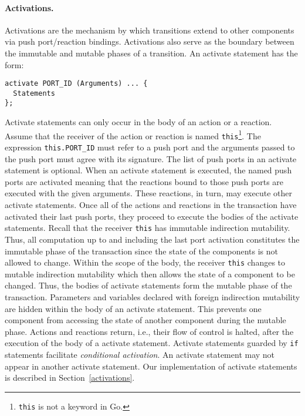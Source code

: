 \paragraph{Activations.}
Activations are the mechanism by which transitions extend to other components via push port/reaction bindings.
Activations also serve as the boundary between the immutable and mutable phases of a transition.
An activate statement has the form:
\begin{verbatim}
activate PORT_ID (Arguments) ... {
  Statements
};
\end{verbatim}
Activate statements can only occur in the body of an action or a reaction.
Assume that the receiver of the action or reaction is named \verb+this+\footnote{\verb+this+ is not a keyword in Go.}.
The expression \verb+this.PORT_ID+ must refer to a push port and the arguments passed to the push port must agree with its signature.
The list of push ports in an activate statement is optional.
When an activate statement is executed, the named push ports are activated meaning that the reactions bound to those push ports are executed with the given arguments.
These reactions, in turn, may execute other activate statements.
Once all of the actions and reactions in the transaction have activated their last push ports, they proceed to execute the bodies of the activate statements.
Recall that the receiver \verb+this+ has immutable indirection mutability.
Thus, all computation up to and including the last port activation constitutes the immutable phase of the transaction since the state of the components is not allowed to change.
Within the scope of the body, the receiver \verb+this+ changes to mutable indirection mutability which then allows the state of a component to be changed.
Thus, the bodies of activate statements form the mutable phase of the transaction.
Parameters and variables declared with foreign indirection mutability are hidden within the body of an activate statement.
This prevents one component from accessing the state of another component during the mutable phase.
Actions and reactions return, i.e., their flow of control is halted, after the execution of the body of a activate statement.
Activate statements guarded by \verb+if+ statements facilitate \emph{conditional activation}.
An activate statement may not appear in another activate statement.
Our implementation of activate statements is described in Section~\ref{activations}.

